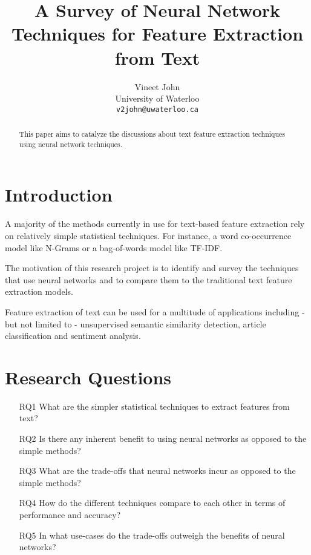 \documentclass[11pt,a4paper]{article}
\title{A Survey of Neural Network Techniques for Feature Extraction from Text}
\author{
  Vineet John \\
  University of Waterloo \\
  {\tt v2john@uwaterloo.ca} \\
}
\date{}
\begin{document}
\maketitle


\begin{abstract}
  This paper aims to catalyze the discussions about text feature extraction techniques using neural network techniques. 
\end{abstract}


\section{Introduction} %
\label{sec:introduction}

  A majority of the methods currently in use for text-based feature extraction rely on relatively simple statistical techniques. For instance, a word co-occurrence model like N-Grams or a bag-of-words model like TF-IDF.

  The motivation of this research project is to identify and survey the techniques that use neural networks and to compare them to the traditional text feature extraction models.

  Feature extraction of text can be used for a multitude of applications including - but not limited to - unsupervised semantic similarity detection, article classification and sentiment analysis.


\section{Research Questions} %
\label{sec:research_questions}

  \begin{itemize}
    \item [RQ1] What are the simpler statistical techniques to extract features from text?
    \item [RQ2] Is there any inherent benefit to using neural networks as opposed to the simple methods?
    \item [RQ3] What are the trade-offs that neural networks incur as opposed to the simple methods?
    \item [RQ4] How do the different techniques compare to each other in terms of performance and accuracy?
    \item [RQ5] In what use-cases do the trade-offs outweigh the benefits of neural networks?
  \end{itemize}
\end{document}
